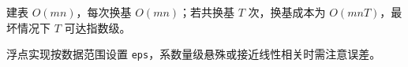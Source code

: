 建表 $O(mn)$，每次换基 $O(mn)$；若共换基 $T$ 次，换基成本为 $O(mnT)$，最坏情况下 $T$ 可达指数级。

浮点实现按数据范围设置 \texttt{eps}，系数量级悬殊或接近线性相关时需注意误差。
